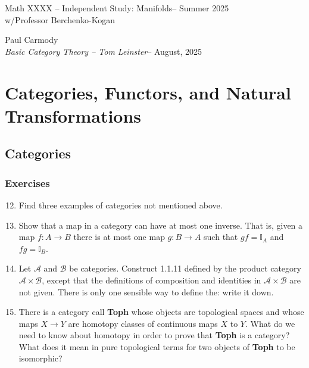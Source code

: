 \documentclass[12pt,a4paper]{report}
\newcommand{\CLASSNAME}{Math XXXX -- Independent Study: Manifolds}
\newcommand{\STUDENTNAME}{Paul Carmody}
\newcommand{\ASSIGNMENT}{\textit{Basic Category Theory -- Tom Leinster}}
\newcommand{\DUEDATE}{August, 2025}
\newcommand{\PROFESSOR}{Professor Berchenko-Kogan}
\newcommand{\SEMESTER}{Summer 2025}
\newcommand{\II}{\mathbb{I}}
\newcommand{\CAT}[1]{\mathscr{#1}}
\begin{document}
\begin{center}
	\Large{\CLASSNAME -- \SEMESTER} \\
	\large{ w/\PROFESSOR}
\end{center}
\begin{center}
	\STUDENTNAME \\
	\ASSIGNMENT -- \DUEDATE\\
\end{center} 

\chapter{Categories, Functors, and Natural Transformations}

\section{Categories}

\subsection{Exercises}

\begin{enumerate}[label=1.1.\arabic*]
\setcounter{enumi}{11}
\item Find three examples of categories not mentioned above.

\item Show that a map in a category can have at most one inverse.  That is, given a map $f: A \to B$ there is at most one map $g: B \to A$ such that $gf=\II_A$ and $fg=\II_B$.

\item Let $\CAT{A}$ and $\CAT{B}$ be categories.  Construct 1.1.11 defined by the product category $\CAT{A}\times\CAT{B}$, except that the definitions of composition and identities in $\CAT{A}\times\CAT{B}$ are not given.  There is only one sensible way to define the: write it down.

\item There is a category call \textbf{Toph} whose objects are topological spaces and whose maps $X\to Y$ are homotopy classes of continuous maps $X$ to $Y$.  What do we need to know about homotopy in order to prove that \textbf{Toph} is a category?  What does it mean in pure topological terms for two objects of \textbf{Toph} to be isomorphic?

\end{enumerate}
\end{document}
